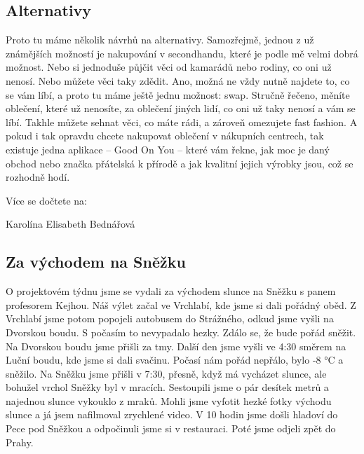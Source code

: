 \documentclass[12pt, a4paper]{article}
\begin{document}
\begin{multicols*}{2}
		\subsection*{Alternativy}
		Proto tu máme několik návrhů na alternativy. Samozřejmě, jednou z už známějších možností je nakupování v secondhandu, které je podle mě velmi dobrá možnost. Nebo si jednoduše půjčit věci od kamarádů nebo rodiny, co oni už nenosí. Nebo můžete věci taky zdědit. Ano, možná ne vždy nutně najdete to, co se vám líbí, a proto tu máme ještě jednu možnost: swap. Stručně řečeno, měníte oblečení, které už nenosíte, za oblečení jiných lidí, co oni už taky nenosí a vám se líbí. Takhle můžete sehnat věci, co máte rádi, a zároveň omezujete fast fashion. A pokud i tak opravdu chcete nakupovat oblečení v nákupních centrech, tak existuje jedna aplikace – Good On You – které vám řekne, jak moc je daný obchod nebo značka přátelská k přírodě a jak kvalitní jejich výrobky jsou, což se rozhodně hodí.

		Více se dočtete na:
		\begin{center}
		\end{center}

		\begin{flushright}
			\footnotesize Karolína Elisabeth Bednářová
		\end{flushright}
		

		\begin{center}
			\section*{Za východem  na Sněžku}
		\end{center}
		O projektovém týdnu jsme se vydali za východem slunce na Sněžku s panem profesorem Kejhou. Náš výlet začal ve Vrchlabí, kde jsme si dali pořádný oběd. Z Vrchlabí jsme potom popojeli autobusem do Strážného, odkud jsme vyšli na Dvorskou boudu. S počasím to nevypadalo hezky. Zdálo se, že bude pořád sněžit. Na Dvorskou boudu jsme přišli za tmy. Další den jsme vyšli ve 4:30 směrem na Luční boudu, kde jsme si dali svačinu. Počasí nám pořád nepřálo, bylo -8 °C a sněžilo. Na Sněžku jsme přišli v 7:30, přesně, když má vycházet slunce, ale bohužel vrchol Sněžky byl v mracích. Sestoupili jsme o pár desítek metrů a najednou slunce vykouklo z mraků. Mohli jsme vyfotit hezké fotky východu slunce a já jsem nafilmoval zrychlené video. V 10 hodin jsme došli hladoví do Pece pod Sněžkou a odpočinuli jsme si v restauraci. Poté jsme odjeli zpět do Prahy.


\end{multicols*}
\end{document}
